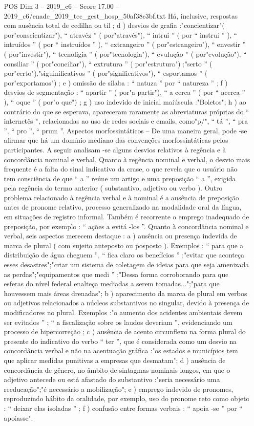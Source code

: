\begin{textsample}{POS Dim 3 – 2019\_c6 – Score 17.00 – 2019\_c6/enade\_2019\_tec\_gest\_hosp\_50af38c3bf.txt}
Há, inclusive, respostas com ausência total de cedilha ou til ; d ) desvios de grafia :"concientizar"( por"conscientizar"), “ atravéz ” ( por"através"), “ intrui ” ( por “ instrui ” ), “ intruídos ” ( por “ instruídos ” ), “ extrangeiro ” ( por"estrangeiro"), “ envestir ” ( por"investir"), “ tecnoligia ” ( por"tecnologia"), “ evulução ” ( por"evolução"), “ consiliar ” ( por"conciliar"), “ extrutura ” ( por"estrutura") ;"serto ” ( por"certo"),"siguinificativos ” ( por"significativos"), “ esportamos ” ( por"exportamos") ; e ) omissão de sílaba : “ natuza ” por “ natureza ” ; f ) desvios de segmentação : “ apartir ” ( por"a partir"), “ a cerca ” ( por “ acerca ” ), “ oque ” ( por"o que") ; g ) uso indevido de inicial maiúscula :"Boletos"; h ) ao contrário do que se esperava, apareceram raramente as abreviaturas próprias do “ internetês ”, relacionadas ao uso de redes sociais e emails, como"p/", “ tá ”, “ pra ”, “ pro ”, “ prum ”.
Aspectos morfossintáticos – De uma maneira geral, pode -se afirmar que há um domínio mediano das convenções morfossintáticas pelos participantes.
A seguir analisam -se alguns desvios relativos à regência e à concordância nominal e verbal.
Quanto à regência nominal e verbal, o desvio mais frequente é a falta do sinal indicativo da crase, o que revela que o usuário não tem consciência de que “ a ” reúne um artigo e uma preposição “ a ”, exigida pela regência do termo anterior ( substantivo, adjetivo ou verbo ).
Outro problema relacionado à regência verbal e à nominal é a ausência de preposição antes de pronome relativo, processo generalizado na modalidade oral da língua, em situações de registro informal.
Também é recorrente o emprego inadequado de preposição, por exemplo : “ ações a evitá -los ”.
Quanto à concordância nominal e verbal, seis aspectos merecem destaque : a ) ausência ou presença indevida de marca de plural ( com sujeito anteposto ou posposto ).
Exemplos : “ para que a distribuição de água cheguem ”, “ fica claro os benefícios ” ;"evitar que aconteça esses desastres";"criar um sistema de coletagem de ideias para que seja amenizada as perdas";"equipamentos que medi ” ;"Dessa forma corroborando para que esferas do nível federal enalteça mediadas a serem tomadas...";"para que houvessem mais áreas drenadas"; b ) aparecimento da marca de plural em verbos ou adjetivos relacionados a núcleos substantivos no singular, devido à presença de modificadores no plural.
Exemplos :"o aumento dos acidentes ambientais devem ser evitados ” ; “ a fiscalização sobre os laudos deveriam ”, evidenciando um processo de hipercorreção ; c ) ausência de acento circunflexo na forma plural do presente do indicativo do verbo “ ter ”, que é considerada como um desvio na concordância verbal e não na acentuação gráfica :"os estados e municípios tem que aplicar medidas punitivas a empresas que desmatam"; d ) ausência de concordância de gênero, no âmbito de sintagmas nominais longos, em que o adjetivo antecede ou está afastado do substantivo :"seria necessário uma reeducação";"é necessário a mobilização"; e ) emprego indevido de pronomes, reproduzindo hábito da oralidade, por exemplo, uso do pronome reto como objeto : “ deixar elas isoladas ” ; f ) confusão entre formas verbais : “ apoia -se ” por “ apoiasse".

\end{textsample}
